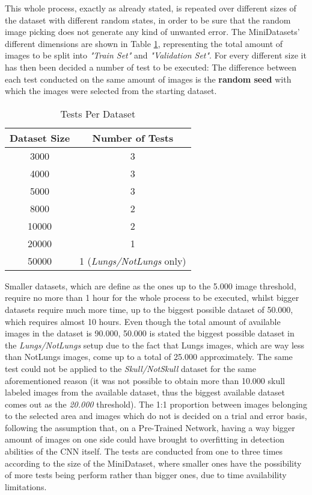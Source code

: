 \documentclass[../main.tex]{subfiles}
\begin{document}
This whole process, exactly as already stated, is repeated over different sizes of the dataset with different random states, in order to be sure that the random image picking does not generate any kind of unwanted error. The MiniDatasets' different dimensions are shown in Table \ref{tab:testsperdata}, representing the total amount of images to be split into \textit{"Train Set"} and \textit{"Validation Set"}. For every different size it has then been decided a number of test to be executed: The difference between each test conducted on the same amount of images is the \textbf{random seed} with which the images were selected from the starting dataset. 

\begin{table}
\centering

\caption{Tests Per Dataset}
\label{tab:testsperdata}

\begin{tabular}{|c|c|}
\hline
Dataset Size & Number of Tests            \\
\hline
3000         & 3                          \\
4000         & 3                          \\
5000         & 3                          \\
8000         & 2                          \\
10000        & 2                          \\
20000        & 1                          \\
50000        & 1 (\textit{Lungs/NotLungs} only)    \\
\hline
\end{tabular}
\end{table}

Smaller datasets, which are define as the ones up to the 5.000 image threshold, require no more than 1 hour for the whole process to be executed, whilst bigger datasets require much more time, up to the biggest possible dataset of 50.000, which requires almost 10 hours. Even though the total amount of available images in the dataset is 90.000, 50.000 is stated the biggest possible dataset in the \textit{Lungs/NotLungs} setup due to the fact that Lungs images, which are way less than NotLungs images, come up to a total of 25.000 approximately. The same test could not be applied to the \textit{Skull/NotSkull} dataset for the same aforementioned reason (it was not possible to obtain more than 10.000 skull labeled images from the available dataset, thus the biggest available dataset comes out as the \textit{20.000} threshold). The 1:1 proportion between images belonging to the selected area and images which do not is decided on a trial and error basis, following the assumption that, on a Pre-Trained Network, having a way bigger amount of images on one side could have brought to overfitting in detection abilities of the CNN itself. The tests are conducted from one to three times according to the size of the MiniDataset, where smaller ones have the possibility of more tests being perform rather than bigger ones, due to time availability limitations.
\end{document}
